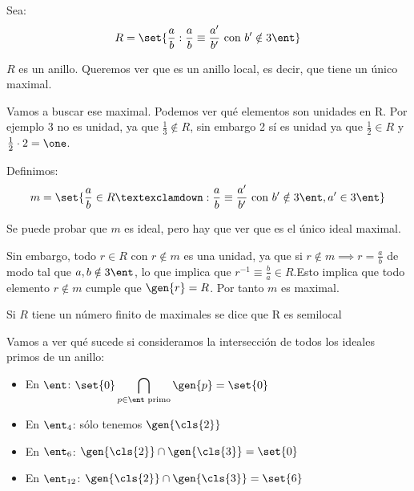 \begin{example}
 Sea:
 $$ R=\set{ \frac{a}{b} : \frac{a}{b}\equiv \frac{a'}{b'} \text{ con } b' \notin 3\ent } $$

$R$ es un anillo. Queremos ver que es un anillo local, es decir, que tiene un único maximal.

Vamos a buscar ese maximal. Podemos ver qué elementos son unidades en R. Por ejemplo 3 no es unidad, ya que $\frac{1}{3} \notin R$, sin embargo 2 sí es unidad ya que $\frac{1}{2} \in R$ y $\frac{1}{2}\cdot 2 = \one$.

Definimos:
$$ m = \set{\frac{a}{b} \in R ¡: \frac{a}{b} \equiv \frac{a'}{b'}\text{ con }b'\notin 3\ent, a' \in 3\ent }$$

Se puede probar que $m$ es ideal, pero hay que ver que es el único ideal maximal.

Sin embargo, todo $r\in R$ con $r \notin m$ es una unidad, ya que si $r \notin m \implies r=\frac{a}{b}$ de modo tal que $a,b\notin 3\ent$, lo que implica que $r^{-1}\equiv \frac{b}{a} \in R$.Esto implica que todo elemento $r \notin m$ cumple que $\gen{r} =R$. Por tanto $m$ es maximal.
\end{example}

\begin{defn}
 Si $R$ tiene un número finito de maximales se dice que R es semilocal
\end{defn}

Vamos a ver qué sucede si consideramos la intersección de todos los ideales primos de un anillo:
\begin{example}
	\begin{itemize}
		\item En $\ent$: $\displaystyle\set{0} \bigcap_{p\in \ent\text{ primo}}\gen{p}=\set{0}$
		\item En $\ent_4$: sólo tenemos $\gen{\cls{2}}$
		\item En $\ent_6$: $\gen{\cls{2}}\cap\gen{\cls{3}}=\set{0}$
		\item En $\ent_{12}$: $\gen{\cls{2}}\cap\gen{\cls{3}}=\set{6}$
	\end{itemize}
\end{example}

